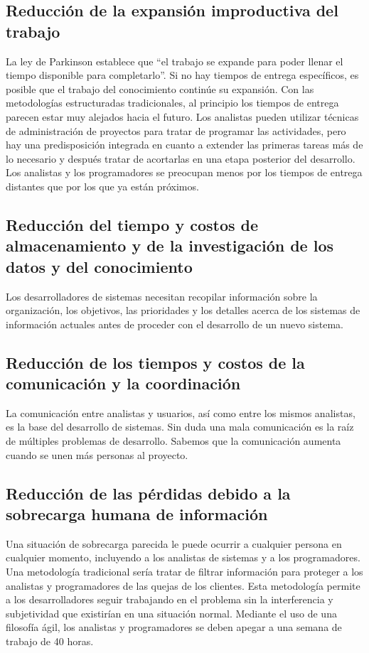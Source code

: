 \subsection{Reducción de la expansión improductiva del trabajo }
La ley de Parkinson establece que “el trabajo se expande para poder llenar el tiempo disponible para completarlo”. Si no hay tiempos de entrega específicos, es posible que el trabajo del conocimiento continúe su expansión. Con las metodologías estructuradas tradicionales, al principio los tiempos de entrega parecen estar muy alejados hacia el futuro. Los analistas pueden utilizar técnicas de administración de proyectos para tratar de programar las actividades, pero hay una predisposición integrada en cuanto a extender las primeras tareas más de lo necesario y después tratar de acortarlas en una etapa posterior del desarrollo. Los analistas y los programadores se preocupan menos por los tiempos de entrega distantes que por los que ya están próximos. 

\subsection{Reducción del tiempo y costos de almacenamiento y de la investigación de los datos y del conocimiento }
Los desarrolladores de sistemas necesitan recopilar información sobre la organización, los objetivos, las prioridades y los detalles acerca de los sistemas de información actuales antes de proceder con el desarrollo de un nuevo sistema.

\subsection{Reducción de los tiempos y costos de la comunicación y la coordinación }
La comunicación entre analistas y usuarios, así como entre los mismos analistas, es la base del desarrollo de sistemas. Sin duda una mala comunicación es la raíz de múltiples problemas de desarrollo. Sabemos que la comunicación aumenta cuando se unen más personas al proyecto. 

\subsection{Reducción de las pérdidas debido a la sobrecarga humana de información }
Una situación de sobrecarga parecida le puede ocurrir a cualquier persona en cualquier momento, incluyendo a los analistas de sistemas y a los programadores. Una metodología tradicional sería tratar de filtrar información para proteger a los analistas y programadores de las quejas de los clientes. Esta metodología permite a los desarrolladores seguir trabajando en el problema sin la interferencia y subjetividad que existirían en una situación normal. Mediante el uso de una filosofía ágil, los analistas y programadores se deben apegar a una semana de trabajo de 40 horas. 
    
